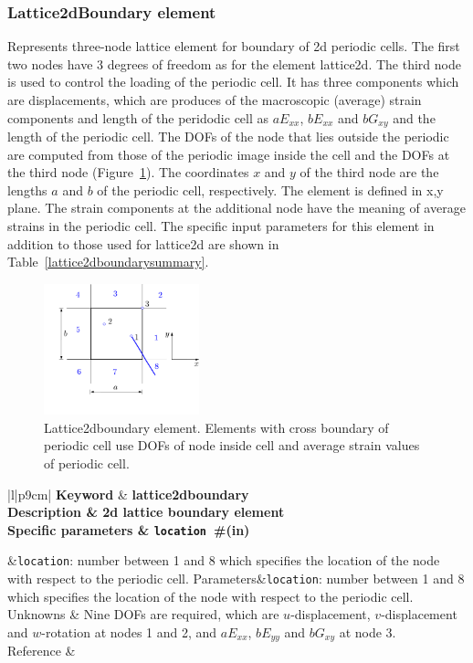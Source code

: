 \documentclass[a4paper]{article}
\newcommand{\param}[1]{\texttt{#1}} %
\newcommand{\field}[2]{\param{#1}~\#{\tiny(#2)}} %
\newcommand{\templabel}{}%
\newcommand{\tempcaption}{}%
\newcounter{nelpar}
\newenvironment{elementsummary}[5]{%
  \gdef\tempcaption{#4}%
  \gdef\templabel{#5}%
  \setcounter{nelpar}{0}%
  \begin{center} %
    \begin{table}[!htb] %
      \begin{tabular}{|l|p{9cm}|}\hline %
        {\bf Keyword} & \bf{#1}\\ %
        {Description} & {#2}\\ %
        {Specific parameters} & {#3}\\ \hline %
}{
  \\ \hline %
      \end{tabular}%
      \caption{\tempcaption}%
      \label{\templabel}%
    \end{table}%
  \end{center}%
}
\newcommand{\elementParam}[1]{%
  \ifthenelse{\value{nelpar}>0} %
             {&{#1}}%
             {\setcounter{nelpar}{1}Parameters&{#1}}%
             \\%
}
\newcommand{\elementDescription}[2]{{#1} & {#2}\\}
\begin{document}
\subsubsection{Lattice2dBoundary element}
Represents three-node lattice element for boundary of 2d periodic cells. The first two nodes have 3 degrees of freedom as for the element lattice2d. The third node is used to control the loading of the periodic cell. It has three components which are displacements, which are produces of the macroscopic (average) strain components and length of the peridodic cell as $aE_{xx}$, $bE_{xx}$  and $bG_{xy}$ and the length of the periodic cell. The DOFs of the node that lies outside the periodic are computed from those of the periodic image inside the cell and the DOFs at the third node (Figure~\ref{lattice2dboundaryfig}). The coordinates $x$ and $y$ of the third node are the lengths $a$ and $b$ of the periodic cell, respectively.  The element is defined in x,y plane. The strain components at the additional node have the meaning of average strains in the periodic cell. The specific input parameters for this element in addition to those used for lattice2d are shown in Table~\ref{lattice2dboundarysummary}. 
\begin{figure}[htb]
  \centering
  \includegraphics[width=0.4\textwidth]{./lattice2dboundaryfig.pdf}
 \caption{Lattice2dboundary element. Elements with cross boundary of periodic cell use DOFs of node inside cell and average strain values of periodic cell.}
 \label{lattice2dboundaryfig}
\end{figure}

\begin{elementsummary}{lattice2dboundary}{2d lattice boundary element}{\field{location}{in}}{lattice2dboundary element summary}{lattice2dboundarysummary}

\elementParam{\param{location}: number between 1 and 8 which specifies the location of the node with respect to the periodic cell.}

\elementDescription{Unknowns}{Nine DOFs are required, which are $u$-displacement, $v$-displacement and $w$-rotation at nodes 1 and 2, and $aE_{xx}$, $bE_{yy}$ and $bG_{xy}$ at node 3.}
\elementDescription{Reference}{\cite{GraJir10}}
\end{elementsummary}
\end{document}
